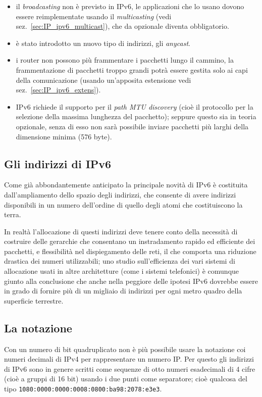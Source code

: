 \begin{itemize}
\item il \textit{broadcasting} non è previsto in IPv6, le applicazioni che lo
  usano dovono essere reimplementate usando il \textit{multicasting} (vedi
  sez.~\ref{sec:IP_ipv6_multicast}), che da opzionale diventa obbligatorio.
\item è stato introdotto un nuovo tipo di indirizzi, gli \textit{anycast}.
\item i router non possono più frammentare i pacchetti lungo il cammino, la
  frammentazione di pacchetti troppo grandi potrà essere gestita solo ai
  capi della comunicazione (usando un'apposita estensione vedi
  sez.~\ref{sec:IP_ipv6_extens}).
\item IPv6 richiede il supporto per il \textit{path MTU discovery} (cioè il
  protocollo per la selezione della massima lunghezza del pacchetto); seppure
  questo sia in teoria opzionale, senza di esso non sarà possibile inviare
  pacchetti più larghi della dimensione minima (576 byte).
\end{itemize}

\subsection{Gli indirizzi di IPv6}
\label{sec:IP_ipv6_addr}

Come già abbondantemente anticipato la principale novità di IPv6 è
costituita dall'ampliamento dello spazio degli indirizzi, che consente di avere
indirizzi disponibili in un numero dell'ordine di quello degli atomi che
costituiscono la terra. 

In realtà l'allocazione di questi indirizzi deve tenere conto della
necessità di costruire delle gerarchie che consentano un instradamento
rapido ed efficiente dei pacchetti, e flessibilità nel dispiegamento delle
reti, il che comporta una riduzione drastica dei numeri utilizzabili; uno
studio sull'efficienza dei vari sistemi di allocazione usati in altre
architetture (come i sistemi telefonici) è comunque giunto alla conclusione
che anche nella peggiore delle ipotesi IPv6 dovrebbe essere in grado di
fornire più di un migliaio di indirizzi per ogni metro quadro della
superficie terrestre.


\subsection{La notazione}
\label{sec:IP_ipv6_notation}
Con un numero di bit quadruplicato non è più possibile usare la notazione
coi numeri decimali di IPv4 per rappresentare un numero IP. Per questo gli
indirizzi di IPv6 sono in genere scritti come sequenze di otto numeri
esadecimali di 4 cifre (cioè a gruppi di 16 bit) usando i due punti come
separatore; cioè qualcosa del tipo
\texttt{1080:0000:0000:0008:0800:ba98:2078:e3e3}.

